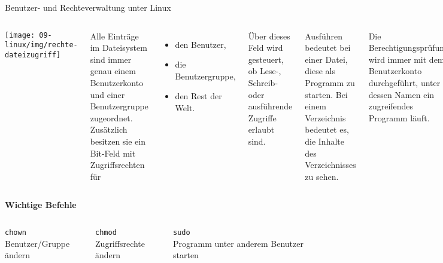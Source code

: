 {
\footnotesize

\begin{frame}[allowframebreaks]{Benutzer- und Rechteverwaltung unter Linux}
    \begin{columns}[onlytextwidth]
        \texttt{[image: 09-linux/img/rechte-dateizugriff]}

        \parbox{\linewidth}{
            Alle Einträge im Dateisystem sind immer genau einem Benutzerkonto
            und einer Benutzergruppe zugeordnet. Zusätzlich besitzen sie ein
            Bit-Feld mit Zugriffsrechten für

            \begin{itemize}
                \item den Benutzer,
                \item die Benutzergruppe,
                \item den Rest der Welt.
            \end{itemize}

            Über dieses Feld wird gesteuert, ob Lese-, Schreib- oder ausführende
            Zugriffe erlaubt sind.

            \medskip

            \glqq{}Ausführen\grqq{} bedeutet bei einer Datei, diese als Programm
            zu starten. Bei einem Verzeichnis bedeutet es, die Inhalte des
            Verzeichnisses zu sehen.

            \medskip

            Die Berechtigungsprüfung wird immer mit dem Benutzerkonto durchgeführt,
            unter dessen Namen ein zugreifendes Programm läuft.
        }
    \end{columns}

    \medskip
    \textbf{Wichtige Befehle}

    \begin{columns}[onlytextwidth]
        \texttt{chown} \\ Benutzer/Gruppe ändern

        \texttt{chmod} \\ Zugriffsrechte ändern

        \texttt{sudo} \\ Programm unter anderem Benutzer starten
    \end{columns}


\end{frame}}
